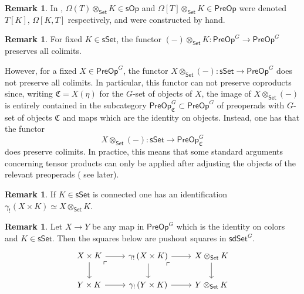 \documentclass[a4paper,10pt
,draft
]{article}%
\numberwithin{equation}{section}
\numberwithin{figure}{section}
\theoremstyle{definition} %
\newtheorem{remark}[equation]{Remark}%
\newcommand{\sOp}{\ensuremath{\mathsf{sOp}}}%
\newcommand{\1}{\ensuremath{\mathbbm 1}}%
\begin{document}
\begin{remark}
	In \cite[\S 7.1]{CM13b}, $\Omega(T) \otimes_{\mathsf{Set}} K \in \sOp$ and $\Omega[T] \otimes_{\mathsf{Set}} K \in \mathsf{PreOp}$ were denoted $T[K]$, $\Omega[K,T]$ respectively, and were constructed by hand.
\end{remark}


\begin{remark}
	For fixed $K \in \mathsf{sSet}$, the functor
	$(-) \otimes_{\mathsf{Set}} K
	\colon \mathsf{PreOp}^G \to \mathsf{PreOp}^G$
	preserves all colimits. 
	
	However, for a fixed $X \in \mathsf{PreOp}^G$,
	the functor 
	$X \otimes_{\mathsf{Set}} (-)
	\colon \mathsf{sSet} \to \mathsf{PreOp}^G$
	does not preserve all colimits.
	In particular, this functor can not preserve coproducts since, writing 
	$\mathfrak{C} = X(\eta)$ for the $G$-set of objects of $X$,
	the image of $X \otimes_{\mathsf{Set}} (-)$ is entirely contained in the subcategory
	$\mathsf{PreOp}^{G}_{\mathfrak{C}} \subset
	\mathsf{PreOp}^G$
	of preoperads with $G$-set of objects $\mathfrak{C}$ and maps which are the identity on objects. 
	Instead, one has that the functor 
\[
	X \otimes_{\mathsf{Set}} (-) \colon
	\mathsf{sSet} \to \mathsf{PreOp}^{G}_{\mathfrak{C}}
\]
	does preserve colimits. 
	In practice, this means that some standard arguments concerning tensor products can only be applied after adjusting the objects of the relevant preoperads
	({\color{red} see later}).
\end{remark}


\begin{remark}\label{OTIMCON REM}
	If $K \in \mathsf{sSet}$ is connected one has an identification
	$\gamma_! \left(X \times K\right) \simeq 
	X \otimes_{\mathsf{Set}} K$.
\end{remark}



\begin{remark}\label{COLORTENSGAM REM}
	Let $X \to Y$ be any map in $\mathsf{PreOp}^G$
	which is the identity on colors and 
	$K \in \mathsf{sSet}$. Then the squares below are pushout squares in $\mathsf{sdSet}^G$.
	\[
	\begin{tikzcd}
	X \times K \ar{r} \ar{d} 
	\arrow[dr, phantom, "\ulcorner", very near start] &
	\gamma_! \left( X \times K \right) \ar{r} \ar{d} 
	\arrow[dr, phantom, "\ulcorner", very near start] &
	X \otimes_{\mathsf{Set}} K \ar{d}
	\\
	Y \times K \ar{r} &
	\gamma_! \left( Y \times K \right) \ar{r} &
	Y \otimes_{\mathsf{Set}} K
	\end{tikzcd}
	\]
\end{remark}
\end{document}
